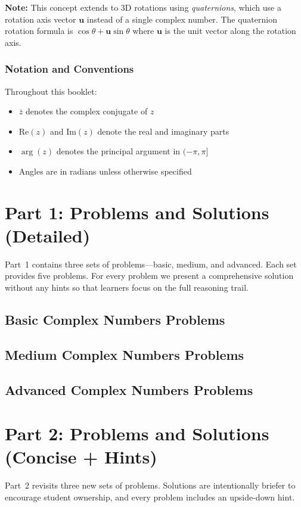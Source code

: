 \documentclass[12pt]{article}
\begin{document}
\textbf{Note:} This concept extends to 3D rotations using \emph{quaternions}, which use a rotation axis vector $\mathbf{u}$ instead of a single complex number. The quaternion rotation formula is $\cos\theta + \mathbf{u}\sin\theta$ where $\mathbf{u}$ is the unit vector along the rotation axis.

\subsubsection{Notation and Conventions}

Throughout this booklet:
\begin{itemize}[leftmargin=*]
  \item $\bar{z}$ denotes the complex conjugate of $z$
  \item $\text{Re}(z)$ and $\text{Im}(z)$ denote the real and imaginary parts
  \item $\arg(z)$ denotes the principal argument in $(-\pi, \pi]$
  \item Angles are in radians unless otherwise specified
\end{itemize}

\section{Part 1: Problems and Solutions (Detailed)}
Part~1 contains three sets of problems---basic, medium, and advanced. Each set provides five problems. For every problem we present a comprehensive solution without any hints so that learners focus on the full reasoning trail.

\subsection{Basic Complex Numbers Problems}


\subsection{Medium Complex Numbers Problems}


\subsection{Advanced Complex Numbers Problems}


\section{Part 2: Problems and Solutions (Concise + Hints)}
Part~2 revisits three new sets of problems. Solutions are intentionally briefer to encourage student ownership, and every problem includes an upside-down hint.
\end{document}
